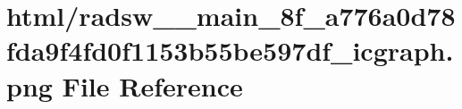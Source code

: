 \hypertarget{radsw____main__8f__a776a0d78fda9f4fd0f1153b55be597df__icgraph_8png}{}\section{html/radsw\+\_\+\+\_\+main\+\_\+8f\+\_\+a776a0d78fda9f4fd0f1153b55be597df\+\_\+icgraph.png File Reference}
\label{radsw____main__8f__a776a0d78fda9f4fd0f1153b55be597df__icgraph_8png}
